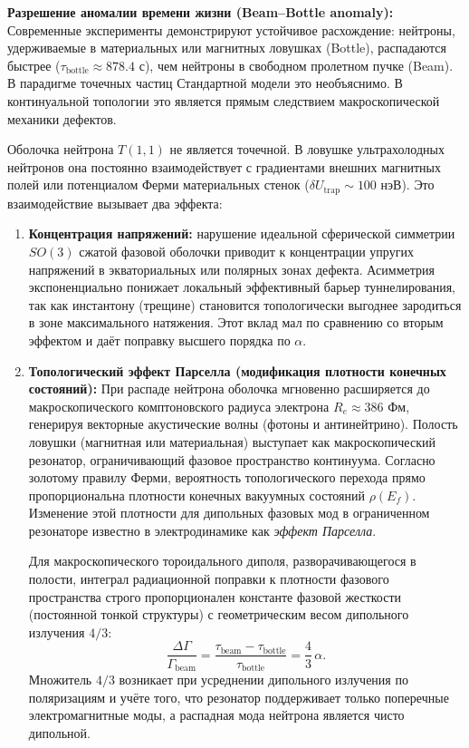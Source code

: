 \documentclass[11pt,a4paper]{article}
\begin{document}
	\textbf{Разрешение аномалии времени жизни (Beam–Bottle anomaly):}
	Современные эксперименты демонстрируют устойчивое расхождение: нейтроны, удерживаемые в материальных или магнитных ловушках (Bottle), распадаются быстрее ($\tau_{\text{bottle}} \approx 878.4$ с), чем нейтроны в свободном пролетном пучке (Beam). В парадигме точечных частиц Стандартной модели это необъяснимо. В континуальной топологии это является прямым следствием макроскопической механики дефектов.
	
	Оболочка нейтрона $T(1,1)$ не является точечной. В ловушке ультрахолодных нейтронов она постоянно взаимодействует с градиентами внешних магнитных полей или потенциалом Ферми материальных стенок ($\delta U_{\text{trap}} \sim 100$ нэВ). Это взаимодействие вызывает два эффекта:
	
	\begin{enumerate}
		\item \textbf{Концентрация напряжений:} нарушение идеальной сферической симметрии $SO(3)$ сжатой фазовой оболочки приводит к концентрации упругих напряжений в экваториальных или полярных зонах дефекта. Асимметрия экспоненциально понижает локальный эффективный барьер туннелирования, так как инстантону (трещине) становится топологически выгоднее зародиться в зоне максимального натяжения. Этот вклад мал по сравнению со вторым эффектом и даёт поправку высшего порядка по $\alpha$.
		
		\item \textbf{Топологический эффект Парселла (модификация плотности конечных состояний):} При распаде нейтрона оболочка мгновенно расширяется до макроскопического комптоновского радиуса электрона $R_e \approx 386$ Фм, генерируя векторные акустические волны (фотоны и антинейтрино). Полость ловушки (магнитная или материальная) выступает как макроскопический резонатор, ограничивающий фазовое пространство континуума. Согласно золотому правилу Ферми, вероятность топологического перехода прямо пропорциональна плотности конечных вакуумных состояний $\rho(E_f)$. Изменение этой плотности для дипольных фазовых мод в ограниченном резонаторе известно в электродинамике как \textit{эффект Парселла}. 
		
		Для макроскопического тороидального диполя, разворачивающегося в полости, интеграл радиационной поправки к плотности фазового пространства строго пропорционален константе фазовой жесткости (постоянной тонкой структуры) с геометрическим весом дипольного излучения $4/3$:
		\begin{equation}
			\frac{\Delta \Gamma}{\Gamma_{\text{beam}}} = \frac{\tau_{\text{beam}} - \tau_{\text{bottle}}}{\tau_{\text{bottle}}} = \frac{4}{3}\,\alpha.
		\end{equation}
		Множитель $4/3$ возникает при усреднении дипольного излучения по поляризациям и учёте того, что резонатор поддерживает только поперечные электромагнитные моды, а распадная мода нейтрона является чисто дипольной.
	\end{enumerate}
	
\end{document}
